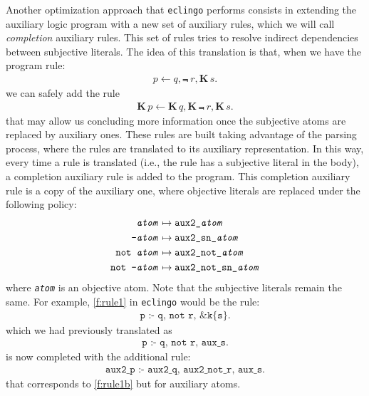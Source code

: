 \documentclass{new_tlp}
\def\K{\mathbf{K}\, }
\def\eclingo{{\tt eclingo}}
\begin{document}
Another optimization approach that \eclingo{} performs consists in extending the auxiliary logic program with a new set of auxiliary rules, which we will call \emph{completion} auxiliary rules. This set of rules tries to resolve indirect dependencies between subjective literals.
The idea of this translation is that, when we have the program rule:
\begin{eqnarray}
p \leftarrow q, \Not \ r, \K s.\label{f:rule1}
\end{eqnarray}
we can safely add the rule
\begin{eqnarray}
\K p \leftarrow \K q, \K \Not \ r, \K s. \label{f:rule1b}
\end{eqnarray}
that may allow us concluding more information once the subjective atoms are replaced by auxiliary ones.
These rules are built taking advantage of the parsing process, where the rules are translated to its auxiliary representation. In this way, every time a rule is translated (i.e., the rule has a subjective literal in the body), a completion auxiliary rule is added to the program. This completion auxiliary rule is a copy of the auxiliary one, where objective literals are replaced under the following policy:
\begin{align*}
    \texttt{\emph{atom}} & \mapsto \texttt{aux2\_\emph{atom}} \\
    \texttt{{-}\emph{atom}} & \mapsto \texttt{aux2\_sn\_\emph{atom}} \\
    \texttt{not \emph{atom}} & \mapsto \texttt{aux2\_not\_\emph{atom}} \\
    \texttt{not {-}\emph{atom}} & \mapsto \texttt{aux2\_not\_sn\_\emph{atom}}
\end{align*}
where \texttt{\emph{atom}} is an objective atom. Note that the subjective literals remain the same. For example, \eqref{f:rule1} in \eclingo{} would be the rule:
\begin{align*}
    \texttt{p\ :-\ q,\ not\ r,\ \&k\{s\}.}
\end{align*}
which we had previously translated as
\begin{align*}
    \texttt{p\ :-\ q,\ not\ r,\ aux\_s.}
\end{align*}
is now completed with the additional rule:
\begin{align*}
    \texttt{aux2\_p\ :-\ aux2\_q,\ aux2\_not\_r,\ aux\_s.}
\end{align*}
that corresponds to \eqref{f:rule1b} but for auxiliary atoms.
\end{document}
